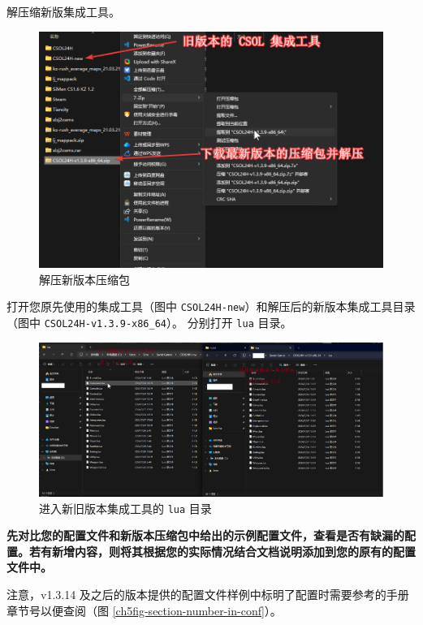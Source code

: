 解压缩新版集成工具。

\begin{figure}[H]
    \Centering
    \includegraphics[width=\textwidth]{docs/assets/update/extract_new_version.png}
    \caption{解压新版本压缩包}
\end{figure}

打开您原先使用的集成工具（图中 \lstinline{CSOL24H-new}）和解压后的新版本集成工具目录（图中 \lstinline{CSOL24H-v1.3.9-x86_64}）。
分别打开 \lstinline{lua} 目录。

\begin{figure}[H]
    \Centering
    \includegraphics[width=\textwidth]{docs/assets/update/replace_00.png}
    \caption{进入新旧版本集成工具的 \lstinline{lua} 目录}
\end{figure}

\textbf{\color{red} 先对比您的配置文件和新版本压缩包中给出的示例配置文件，查看是否有缺漏的配置。若有新增内容，则将其根据您的实际情况结合文档说明添加到您的原有的配置文件中。}

注意，v1.3.14 及之后的版本提供的配置文件样例中标明了配置时需要参考的手册章节号以便查阅（图 \ref{ch5fig-section-number-in-conf}）。

